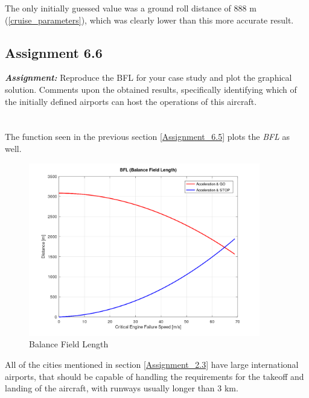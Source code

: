 \documentclass{article}
\begin{document}
The only initially guessed value was a ground roll distance of 888 m (\ref{cruise_parameters}), which was clearly lower than this more accurate result. 



\clearpage






\subsection{Assignment 6.6\label{Assignment_6.6}}

\textbf{\textit{Assignment:}} Reproduce the BFL for your case study and plot the graphical solution. 
Comments upon the obtained results, specifically identifying which of the initially 
defined airports can host the operations of this aircraft. \\ \\ \\ 

The function seen in the previous section \ref{Assignment_6.5} plots the \textit{BFL} as well. \\ 

\begin{figure}[h!]
    \centering
    \includegraphics[width=0.9\textwidth]{Sources/Plots_and_Pictures/BFL.png}
    \caption{Balance Field Length}
    \label{BFL}
\end{figure}

All of the cities mentioned in section \ref{Assignment_2.3} have large international airports, that should be 
capable of handling the requirements for the takeoff and landing of the aircraft, with runways usually longer than 3 km. \\
\end{document}
